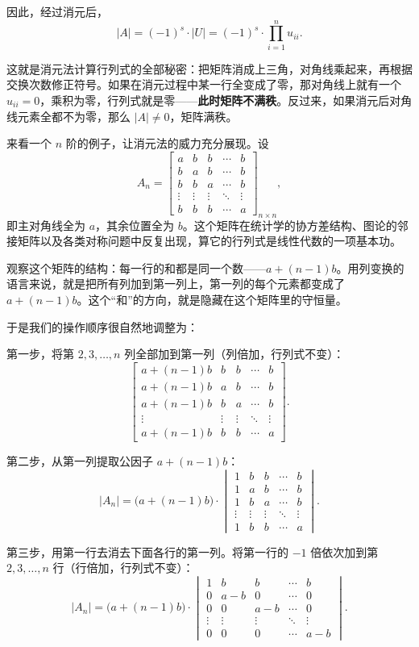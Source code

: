 \documentclass[UTF8]{ctexbook}
\begin{document}
因此，经过消元后，
\[
|A|=(-1)^s\cdot|U|=(-1)^s\cdot\prod_{i=1}^{n} u_{ii}.
\]

这就是消元法计算行列式的全部秘密：把矩阵消成上三角，对角线乘起来，再根据交换次数修正符号。如果在消元过程中某一行全变成了零，那对角线上就有一个 $u_{ii}=0$，乘积为零，行列式就是零——\textbf{此时矩阵不满秩}。反过来，如果消元后对角线元素全都不为零，那么 $|A|\neq 0$，矩阵满秩。

来看一个 $n$ 阶的例子，让消元法的威力充分展现。设
\[
A_n=\begin{bmatrix}
a & b & b & \cdots & b\\
b & a & b & \cdots & b\\
b & b & a & \cdots & b\\
\vdots & \vdots & \vdots & \ddots & \vdots\\
b & b & b & \cdots & a
\end{bmatrix}_{n\times n},
\]
即主对角线全为 $a$，其余位置全为 $b$。这个矩阵在统计学的协方差结构、图论的邻接矩阵以及各类对称问题中反复出现，算它的行列式是线性代数的一项基本功。

观察这个矩阵的结构：每一行的和都是同一个数——$a+(n-1)b$。用列变换的语言来说，就是把所有列加到第一列上，第一列的每个元素都变成了 $a+(n-1)b$。这个“和”的方向，就是隐藏在这个矩阵里的守恒量。

于是我们的操作顺序很自然地调整为：

第一步，将第 $2,3,\dots,n$ 列全部加到第一列（列倍加，行列式不变）：
\[
\begin{bmatrix}
a+(n-1)b & b & b & \cdots & b\\
a+(n-1)b & a & b & \cdots & b\\
a+(n-1)b & b & a & \cdots & b\\
\vdots & \vdots & \vdots & \ddots & \vdots\\
a+(n-1)b & b & b & \cdots & a
\end{bmatrix}.
\]

第二步，从第一列提取公因子 $a+(n-1)b$：
\[
|A_n|=\bigl(a+(n-1)b\bigr)\cdot
\begin{vmatrix}
1 & b & b & \cdots & b\\
1 & a & b & \cdots & b\\
1 & b & a & \cdots & b\\
\vdots & \vdots & \vdots & \ddots & \vdots\\
1 & b & b & \cdots & a
\end{vmatrix}.
\]

第三步，用第一行去消去下面各行的第一列。将第一行的 $-1$ 倍依次加到第 $2,3,\dots,n$ 行（行倍加，行列式不变）：
\[
|A_n|=\bigl(a+(n-1)b\bigr)\cdot
\begin{vmatrix}
1 & b & b & \cdots & b\\
0 & a-b & 0 & \cdots & 0\\
0 & 0 & a-b & \cdots & 0\\
\vdots & \vdots & \vdots & \ddots & \vdots\\
0 & 0 & 0 & \cdots & a-b
\end{vmatrix}.
\]
\end{document}
